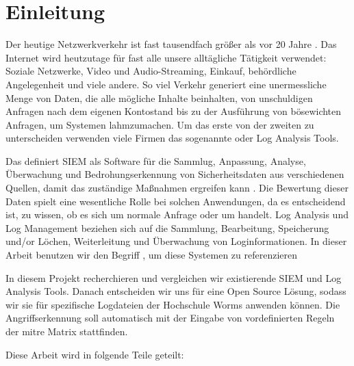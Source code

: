 \section{Einleitung}

Der heutige Netzwerkverkehr ist fast tausendfach größer als vor 20 Jahre \citep{Roser_I}. Das Internet wird heutzutage für fast alle unsere alltägliche Tätigkeit verwendet: Soziale Netzwerke, Video und Audio-Streaming, Einkauf, behördliche Angelegenheit und viele andere. So viel Verkehr generiert eine unermessliche Menge von Daten, die alle mögliche Inhalte beinhalten, von unschuldigen Anfragen nach dem eigenen Kontostand bis zu der Ausführung von bösewichten Anfragen, um Systemen lahmzumachen. Um das erste von der zweiten zu unterscheiden verwenden viele Firmen das sogenannte  oder Log Analysis Tools.

Das  definiert \gls{SIEM} als Software für die Sammlug, Anpassung, Analyse, Überwachung und Bedrohungserkennung von Sicherheitsdaten aus verschiedenen Quellen, damit das zuständige  Maßnahmen ergreifen kann \citep{NIST_Definitions}. Die Bewertung dieser Daten spielt eine wesentliche Rolle bei solchen Anwendungen, da es entscheidend ist, zu wissen, ob es sich um normale Anfrage oder um  handelt. Log Analysis und Log Management beziehen sich auf die Sammlung, Bearbeitung, Speicherung und/or Löchen, Weiterleitung und Überwachung von Loginformationen. In dieser Arbeit benutzen wir den Begriff , um diese Systemen zu referenzieren

In diesem Projekt recherchieren und vergleichen wir  existierende \gls{SIEM} und Log Analysis Tools. Danach entscheiden wir uns für eine \gls{Open Source} Lösung, sodass wir sie für spezifische Logdateien der Hochschule Worms anwenden können. Die Angriffserkennung soll automatisch mit der Eingabe von vordefinierten Regeln der \gls{mitre} Matrix stattfinden.

Diese Arbeit wird in folgende Teile geteilt:





